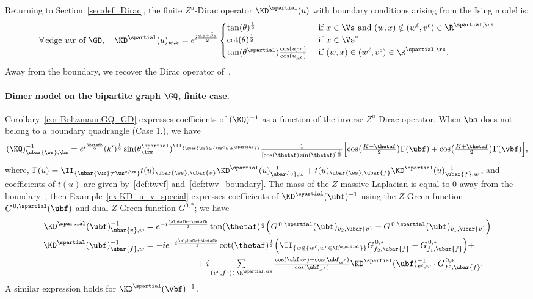 \documentclass[a4paper,twoside,11pt]{article}
\begin{document}
Returning to Section~\ref{sec:def_Dirac}, the finite
$Z^u$-Dirac operator $\KD^\spartial(u)$ with boundary conditions arising from the Ising model is:
\begin{equation*}
\forall\,\text{edge $wx$ of $\GD$},\quad 
\KD^\spartial(u)_{w,x}=
e^{i\frac{\bar{\alpha}_e+\bar{\beta}_e}{2}}
\begin{cases}
\tan(\theta)^{\frac{1}{2}}& \text{ if $x\in\Vs$ and $(w,x)\notin(w^\ell,v^c)\in\R^{\spartial,\rs}$}\\
\cot(\theta)^{\frac{1}{2}}& \text{ if $x\in\Vs^*$}\\
\tan(\theta^\spartial)\frac{\cos(u_{\beta^r})}{\cos(u_{\alpha^\ell})}& \text{ if $(w,x)\in(w^\ell,v^c)\in\R^{\spartial,\rs}$}.
\end{cases}
\end{equation*}
Away from the boundary, we recover the Dirac operator of~\cite{Kenyon3}.
\paragraph{Dimer model on the bipartite graph $\GQ$, finite case.}
Corollary~\ref{cor:BoltzmannGQ_GD} expresses coefficients of $(\KQ)^{-1}$ as a function of the inverse $Z^u$-Dirac operator. 
When $\bs$ does not belong to a boundary quadrangle (Case 1.), we have
\begin{equation*}\textstyle
(\KQ)^{-1}_{\ubar{\ws},\bs}=e^{i\frac{\betafb}{2}}(k')^{\frac{1}{2}}\sin(\theta^{\spartial}_\irm)^{\II_{\{\ubar{\ws}\in\{\ws^c\in\R^\spartial\}\}}}
\frac{1}{[\cos(\thetaf)\sin(\thetaf)]^{\frac{1}{2}}}
\Bigl[\cos\bigl(\frac{K-\thetaf}{2}\bigr)\Gamma(\ubf)+ \cos\bigl(\frac{K+\thetaf}{2}\bigr)\Gamma(\vbf)\Bigr],
\end{equation*}
where, $\Gamma(u)=\II_{\{\ubar{\ws}\neq \ws^{c,\rs}\}}
t(u)_{\ubar{\ws},\ubar{v}}\KD^\spartial(u)^{-1}_{\ubar{v},w}+t(u)_{\ubar{\ws},\ubar{f}}\KD^\spartial(u)^{-1}_{\ubar{f},w}$, and coefficients 
of $t(u)$ are given by~\eqref{def:twvf} and~\eqref{def:twv_boundary}. 
The mass of the $Z$-massive Laplacian is equal to 0 away from the boundary~\cite{BdTR1}; then
Example~\ref{ex:KD_u_v_special} expresses coefficients of
$\KD^\spartial(\ubf)^{-1}$ using the $Z$-Green function $G^{\, 0,\spartial}(\ubf)$ and dual $Z$-Green
function $G^{0,*}$; we have
\begin{align*}
\KD^\spartial(\ubf)^{-1}_{\ubar{v},w}&\textstyle =e^{-i\frac{\alphafb+\betafb}{2}}\tan(\thetaf)^{\frac{1}{2}}
\Bigl(G^{\, 0,\spartial}(\ubf)_{v_2,\ubar{v}}-G^{\, 0,\spartial}(\ubf)_{v_1,\ubar{v}}\Bigr)\\
\KD^\spartial(\ubf)^{-1}_{\ubar{f},w}&\textstyle =-ie^{-i\frac{\alphafb+\betafb}{2}}\cot(\thetaf)^{\frac{1}{2}}
\Bigl(\II_{\{w\notin\{w^\ell,w^r\in \R^\spartial\}\}}G^{\, 0,*}_{f_2,\ubar{f}}-
G^{\, 0,*}_{f_1,\ubar{f}}\Bigl)+\\
&\textstyle\quad \quad \quad \quad 
\ \ \ \ \ \ +
i \sum\limits_{(v^c,f^c)\in\R^{\spartial,\rs}}\frac{\cos(\ubf_{\beta^r})-\cos(\ubf_{\alpha^\ell})}{\cos(\ubf_{\alpha^\ell})}
\KD^{\spartial}(\ubf)^{-1}_{v^c,w}\cdot G^{\, 0,*}_{f^c,\ubar{f}}.
\end{align*}
A similar expression holds for $\KD^\spartial(\vbf)^{-1}$.
\end{document}
